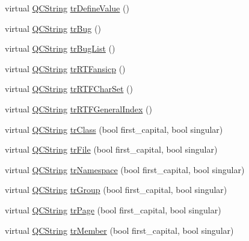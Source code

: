 \begin{DoxyCompactItemize}
virtual \mbox{\hyperlink{class_q_c_string}{Q\+C\+String}} \mbox{\hyperlink{class_translator_polish_ae13b5d65dbff36936d3acc4a07adb90a}{tr\+Define\+Value}} ()
\item 
virtual \mbox{\hyperlink{class_q_c_string}{Q\+C\+String}} \mbox{\hyperlink{class_translator_polish_aa91f8e15b22436ae26172dbe68a6adf8}{tr\+Bug}} ()
\item 
virtual \mbox{\hyperlink{class_q_c_string}{Q\+C\+String}} \mbox{\hyperlink{class_translator_polish_a20de56dd770718181b091c4158bf0657}{tr\+Bug\+List}} ()
\item 
virtual \mbox{\hyperlink{class_q_c_string}{Q\+C\+String}} \mbox{\hyperlink{class_translator_polish_a03cafa9e4c4b5c191d1e52c81862235f}{tr\+R\+T\+Fansicp}} ()
\item 
virtual \mbox{\hyperlink{class_q_c_string}{Q\+C\+String}} \mbox{\hyperlink{class_translator_polish_a88a1c426ffc799dd4217c52dfb7f8170}{tr\+R\+T\+F\+Char\+Set}} ()
\item 
virtual \mbox{\hyperlink{class_q_c_string}{Q\+C\+String}} \mbox{\hyperlink{class_translator_polish_a0f9d8838e315e50c6d7c0eaa2ac6b6eb}{tr\+R\+T\+F\+General\+Index}} ()
\item 
virtual \mbox{\hyperlink{class_q_c_string}{Q\+C\+String}} \mbox{\hyperlink{class_translator_polish_a0ee6755e5fb669d0b2e6676415a5bed0}{tr\+Class}} (bool first\+\_\+capital, bool singular)
\item 
virtual \mbox{\hyperlink{class_q_c_string}{Q\+C\+String}} \mbox{\hyperlink{class_translator_polish_a0a1dab2f81c3273ed3b0970844ce977a}{tr\+File}} (bool first\+\_\+capital, bool singular)
\item 
virtual \mbox{\hyperlink{class_q_c_string}{Q\+C\+String}} \mbox{\hyperlink{class_translator_polish_ab1170336b09d8143cc0391cf2f66de6e}{tr\+Namespace}} (bool first\+\_\+capital, bool singular)
\item 
virtual \mbox{\hyperlink{class_q_c_string}{Q\+C\+String}} \mbox{\hyperlink{class_translator_polish_a2a432d8fddb8ae68fe3f85d78bb06943}{tr\+Group}} (bool first\+\_\+capital, bool singular)
\item 
virtual \mbox{\hyperlink{class_q_c_string}{Q\+C\+String}} \mbox{\hyperlink{class_translator_polish_a7a2c4092e039a8154d249301433e65b0}{tr\+Page}} (bool first\+\_\+capital, bool singular)
\item 
virtual \mbox{\hyperlink{class_q_c_string}{Q\+C\+String}} \mbox{\hyperlink{class_translator_polish_a9f03af97f82667ea66b8b138426e420b}{tr\+Member}} (bool first\+\_\+capital, bool singular)
\item 

\end{DoxyCompactItemize}
